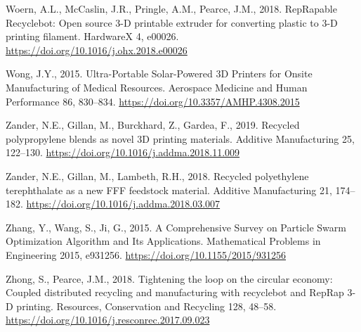 \documentclass[
  12pt,
  number,
  review]{elsarticle}
\newlength{\cslhangindent}
\newlength{\cslentryspacingunit} %
\newenvironment{CSLReferences}[2] %
 {%
  \setlength{\parindent}{0pt}
  \ifodd #1
  \let\oldpar\par
  \def\par{\hangindent=\cslhangindent\oldpar}
  \fi
  \setlength{\parskip}{#2\cslentryspacingunit}
 }%
 {}
\begin{document}
\begin{CSLReferences}{1}{0}
\leavevmode{}%
Woern, A.L., McCaslin, J.R., Pringle, A.M., Pearce, J.M., 2018.
{RepRapable Recyclebot}: {Open} source 3-{D} printable extruder for
converting plastic to 3-{D} printing filament. HardwareX 4, e00026.
\url{https://doi.org/10.1016/j.ohx.2018.e00026}

\leavevmode{}%
Wong, J.Y., 2015. Ultra-{Portable Solar-Powered 3D Printers} for {Onsite
Manufacturing} of {Medical Resources}. Aerospace Medicine and Human
Performance 86, 830--834. \url{https://doi.org/10.3357/AMHP.4308.2015}

\leavevmode{}%
Zander, N.E., Gillan, M., Burckhard, Z., Gardea, F., 2019. Recycled
polypropylene blends as novel {3D} printing materials. Additive
Manufacturing 25, 122--130.
\url{https://doi.org/10.1016/j.addma.2018.11.009}

\leavevmode{}%
Zander, N.E., Gillan, M., Lambeth, R.H., 2018. Recycled polyethylene
terephthalate as a new {FFF} feedstock material. Additive Manufacturing
21, 174--182. \url{https://doi.org/10.1016/j.addma.2018.03.007}

\leavevmode{}%
Zhang, Y., Wang, S., Ji, G., 2015. A {Comprehensive Survey} on {Particle
Swarm Optimization Algorithm} and {Its Applications}. Mathematical
Problems in Engineering 2015, e931256.
\url{https://doi.org/10.1155/2015/931256}

\leavevmode{}%
Zhong, S., Pearce, J.M., 2018. Tightening the loop on the circular
economy: {Coupled} distributed recycling and manufacturing with
recyclebot and {RepRap} 3-{D} printing. Resources, Conservation and
Recycling 128, 48--58.
\url{https://doi.org/10.1016/j.resconrec.2017.09.023}

\end{CSLReferences}
\end{document}
